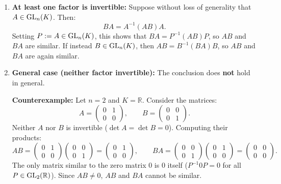 \begin{exercisesolution}
\label{sol:similarity_of_matrix_products}
\begin{enumerate}[label=\textbf{(\alph*)}]
    \item \textbf{At least one factor is invertible:}
    Suppose without loss of generality that $A \in \operatorname{GL}_n(K)$. Then:
    \[
    B A = A^{-1} (A B) A.
    \]
    Setting $P := A \in \operatorname{GL}_n(K)$, this shows that $BA = P^{-1} (AB) P$, so $AB$ and $BA$ are similar.
    If instead $B \in \operatorname{GL}_n(K)$, then $AB = B^{-1} (BA) B$, so $AB$ and $BA$ are again similar.

    \item \textbf{General case (neither factor invertible):}
    The conclusion does \textbf{not} hold in general.
    
    \textbf{Counterexample:} Let $n = 2$ and $K = \mathbb{R}$. Consider the matrices:
    \[
    A = \begin{pmatrix} 0 & 1 \\ 0 & 0 \end{pmatrix}, \qquad B = \begin{pmatrix} 0 & 0 \\ 0 & 1 \end{pmatrix}.
    \]
    Neither $A$ nor $B$ is invertible ($\det A = \det B = 0$). Computing their products:
    \[
    AB = \begin{pmatrix} 0 & 1 \\ 0 & 0 \end{pmatrix} \begin{pmatrix} 0 & 0 \\ 0 & 1 \end{pmatrix} = \begin{pmatrix} 0 & 1 \\ 0 & 0 \end{pmatrix}, \qquad
    BA = \begin{pmatrix} 0 & 0 \\ 0 & 1 \end{pmatrix} \begin{pmatrix} 0 & 1 \\ 0 & 0 \end{pmatrix} = \begin{pmatrix} 0 & 0 \\ 0 & 0 \end{pmatrix}.
    \]
    The only matrix similar to the zero matrix $0$ is $0$ itself ($P^{-1} 0 P = 0$ for all $P \in \operatorname{GL}_2(\mathbb{R})$). Since $AB \ne 0$, $AB$ and $BA$ cannot be similar.
\end{enumerate}
\end{exercisesolution}

